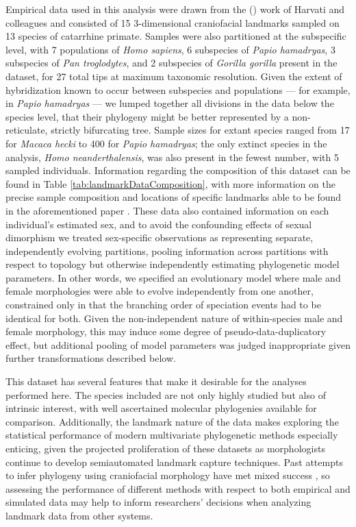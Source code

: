 \documentclass[10pt, twocolumn, twoside]{article}
\begin{document}
Empirical data used in this analysis were drawn from the (\citeyear{harvatiNeanderthalTaxonomyReconsidered2004}) work of Harvati and colleagues and consisted of 15 3-dimensional craniofacial landmarks sampled on 13 species of catarrhine primate. Samples were also partitioned at the subspecific level, with 7 populations of \textit{Homo sapiens}, 6 subspecies of \textit{Papio hamadryas}, 3 subspecies of \textit{Pan troglodytes}, and 2 subspecies of \textit{Gorilla gorilla} present in the dataset, for 27 total tips at maximum taxonomic resolution. Given the extent of hybridization known to occur between subspecies and populations --- for example, in \textit{Papio hamadryas} \citep{rogersComparativeGenomicsComplex2019} --- we lumped together all divisions in the data below the species level, that their phylogeny might be better represented by a non-reticulate, strictly bifurcating tree. Sample sizes for extant species ranged from 17 for \textit{Macaca hecki} to 400 for \textit{Papio hamadryas}; the only extinct species in the analysis, \textit{Homo neanderthalensis}, was also present in the fewest number, with 5 sampled individuals. Information regarding the composition of this dataset can be found in Table \ref{tab:landmarkDataComposition}, with more information on the precise sample composition and locations of specific landmarks able to be found in the aforementioned paper \citep{harvatiNeanderthalTaxonomyReconsidered2004}. These data also contained information on each individual's estimated sex, and to avoid the confounding effects of sexual dimorphism we treated sex-specific observations as representing separate, independently evolving partitions, pooling information across partitions with respect to topology but otherwise independently estimating phylogenetic model parameters. In other words, we specified an evolutionary model where male and female morphologies were able to evolve independently from one another, constrained only in that the branching order of speciation events had to be identical for both. Given the non-independent nature of within-species male and female morphology, this may induce some degree of pseudo-data-duplicatory effect, but additional pooling of model parameters was judged inappropriate given further transformations described below.

This dataset has several features that make it desirable for the analyses performed here. The species included are not only highly studied but also of intrinsic interest, with well ascertained molecular phylogenies available for comparison. Additionally, the landmark nature of the data makes exploring the statistical performance of modern multivariate phylogenetic methods especially enticing, given the projected proliferation of these datasets as morphologists continue to develop semiautomated landmark capture techniques. Past attempts to infer phylogeny using craniofacial morphology have met mixed success \citep[e.g.][]{collardHowReliableAre2000}, so assessing the performance of different methods with respect to both empirical and simulated data may help to inform researchers' decisions when analyzing landmark data from other systems. 
\end{document}
